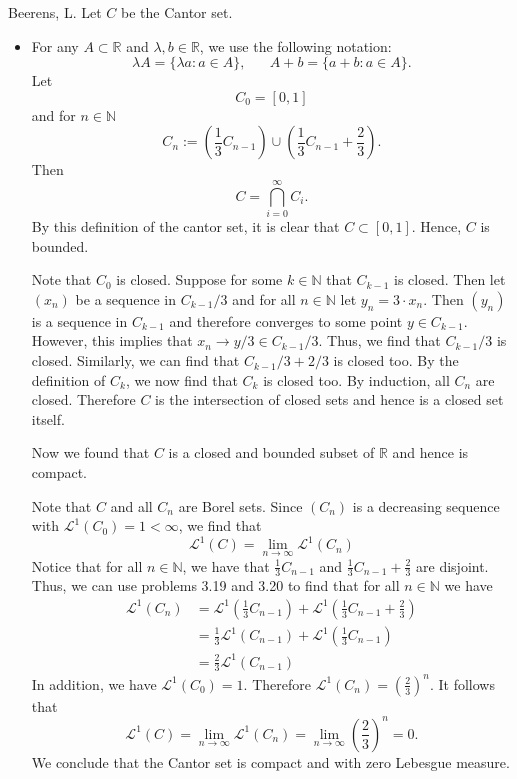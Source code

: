 \begin{solution}[4.9]{Beerens, L.}
    Let $C$ be the Cantor set.
    \begin{itemize}
        \item For any $A\subset\mathbb{R}$ and $\lambda, b\in\mathbb{R}$, we use the following notation:
        $$
            \lambda A = \{\lambda a : a\in A \},\hspace{20pt} A+b = \{a+b:a\in A\}.
        $$
        Let
        $$
            C_0 = [0,1]
        $$
        and for $n\in\mathbb{N}$
        $$
            C_n := \left(\frac{1}{3}C_{n-1}\right) \cup \left(\frac{1}{3}C_{n-1} + \frac{2}{3}\right).
        $$
        Then 
        $$
            C = \bigcap_{i=0}^\infty C_i.
        $$
        By this definition of the cantor set, it is clear that $C\subset[0,1]$. Hence, $C$ is bounded. 
        
        Note that $C_0$ is closed. Suppose for some $k\in\mathbb{N}$ that $C_{k-1}$ is closed. Then let $(x_n)$ be a sequence in $C_{k-1}/3$ and for all $n\in\mathbb{N}$ let $y_n=3\cdot x_n$. Then $(y_n)$ is a sequence in $C_{k-1}$ and therefore converges to some point $y\in C_{k-1}$. However, this implies that $x_n\rightarrow y/3\in C_{k-1}/3$. Thus, we find that $C_{k-1}/3$ is closed. Similarly, we can find that $C_{k-1}/3+2/3$ is closed too. By the definition of $C_k$, we now find that $C_k$ is closed too. By induction, all $C_n$ are closed. Therefore $C$ is the intersection of closed sets and hence is a closed set itself.
        
        Now we found that $C$ is a closed and bounded subset of $\mathbb{R}$ and hence is compact. 
        
        Note that $C$ and all $C_n$ are Borel sets.
        Since $(C_n)$ is a decreasing sequence with $\mathcal{L}^1(C_0)=1<\infty$, we find that
        $$
            \mathcal{L}^1(C) = \lim_{n\rightarrow\infty}\mathcal{L}^1(C_n)
        $$
        Notice that for all $n\in\mathbb{N}$, we have that $\frac{1}{3}C_{n-1}$ and $\frac{1}{3}C_{n-1} + \frac{2}{3}$ are disjoint. Thus, we can use problems 3.19 and 3.20 to find that for all $n\in\mathbb{N}$ we have
        \begin{align*}
            \mathcal{L}^1 (C_n) &= \mathcal{L}^1\left(\frac{1}{3}C_{n-1}\right)+\mathcal{L}^1\left( \frac{1}{3}C_{n-1} + \frac{2}{3} \right)\\ 
            &= \frac{1}{3}\mathcal{L}^1(C_{n-1}) + \mathcal{L}^1\left(\frac{1}{3}C_{n-1}\right)\\
            &= \frac{2}{3}\mathcal{L}^1(C_{n-1})
        \end{align*}
        In addition, we have $\mathcal{L}^1(C_0)=1$. Therefore $\mathcal{L}^1(C_n) = \left(\frac{2}{3}\right)^{n}$. It follows that 
        $$
            \mathcal{L}^1(C)  = \lim_{n\rightarrow \infty}\mathcal{L}^1(C_n) = \lim_{n\rightarrow \infty}\left(\frac{2}{3}\right)^{n} = 0.
        $$
        We conclude that the Cantor set is compact and with zero Lebesgue measure.
        

\end{itemize}
\end{solution}
